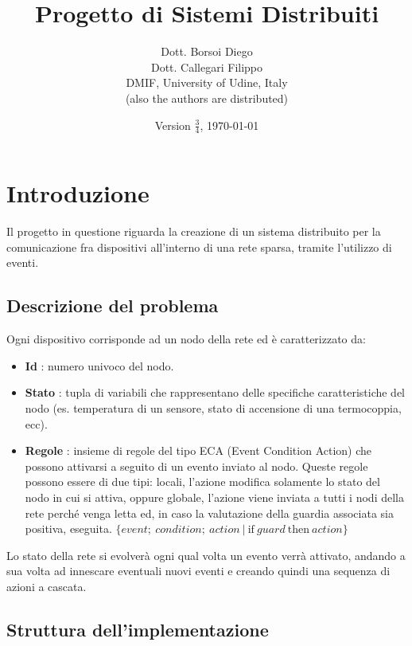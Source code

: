 \documentclass[italian]{memoir}
\title{Progetto di Sistemi Distribuiti}
\author{Dott. Borsoi Diego\\Dott. Callegari Filippo\\ DMIF, University of Udine,
	   Italy\\(also the authors are distributed)}
\date{Version $\frac{3}{4}$, \today}
\begin{document}
\maketitle
\newpage

\tableofcontents
\newpage



\chapter{Introduzione}\label{ch:intro}

Il progetto in questione riguarda la creazione di un sistema distribuito per la comunicazione
	   fra dispositivi all'interno di una rete sparsa, tramite l'utilizzo di eventi.

\section{Descrizione del problema}

Ogni dispositivo corrisponde ad un nodo della rete ed è caratterizzato da:
\begin{itemize}
\item \textbf{Id} : numero univoco del nodo.
\item \textbf{Stato} : tupla di variabili che rappresentano delle specifiche caratteristiche
	   del nodo (es. temperatura di un sensore, stato di accensione di una termocoppia,
	   ecc).
\item \textbf{Regole} : insieme di regole del tipo ECA (Event Condition Action) che
	   possono attivarsi a seguito di un evento inviato al nodo. Queste regole possono
	   essere
	   di due tipi: locali, l'azione modifica solamente lo stato del nodo in cui si
	   attiva,
	   oppure globale, l'azione viene inviata a tutti i nodi della rete perché venga
	   letta
	   ed, in caso la valutazione della guardia associata sia positiva, eseguita.
\center$\{event;~condition;~action~|~\text{if}~guard~\text{then}~action\}$
\end{itemize}

Lo stato della rete si evolverà ogni qual volta un evento verrà attivato, andando
	   a sua volta ad innescare eventuali nuovi eventi e creando quindi una sequenza
	   di
	   azioni a cascata.

\section{Struttura dell'implementazione}
\end{document}
